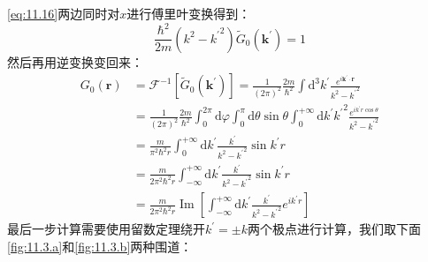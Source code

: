 \documentclass[a4paper,zihao=-4,linespread=1]{ctexrep}
\begin{document}
	\ref{eq:11.16}两边同时对$x$进行傅里叶变换得到：
	\[\frac{\hbar^2}{2m}\left(k^2-{k^\prime}^2\right)\tilde{G}_0(\mathbf{k}^\prime)=1\]
	然后再用逆变换变回来：
	\begin{equation}
		\label{eq:11.18}
		\begin{aligned}
			G_0(\mathbf{r})&=\mathscr{F}^{-1}\left[\tilde{G}_0(\mathbf{k}^\prime)\right]=\frac{1}{(2\pi)^2}\frac{2m}{\hbar^2}\int\mathrm{d}^3k^\prime\frac{e^{i\mathbf{k}^\prime\cdot\mathbf{r}}}{k^2-{k^\prime}^2}\\
			&=\frac{1}{(2\pi)^2}\frac{2m}{\hbar^2}\int_0^{2\pi}\mathrm{d}\varphi\int_0^\pi\mathrm{d}\theta\sin\theta\int_0^{+\infty}\mathrm{d}k^\prime{k^\prime}^2\frac{e^{i{k}^\prime{r}\cos\theta}}{k^2-{k^\prime}^2}\\
			&=\frac{m}{\pi^2\hbar^2r}\int_0^{+\infty}\mathrm{d}k^\prime\frac{{k^\prime}}{k^2-{k^\prime}^2}\sin k^\prime r\\
			&=\frac{m}{2\pi^2\hbar^2r}\int_{-\infty}^{+\infty}\mathrm{d}k^\prime\frac{{k^\prime}}{k^2-{k^\prime}^2}\sin k^\prime r\\
			&=\frac{m}{2\pi^2\hbar^2r}\operatorname{Im}\left[\int_{-\infty}^{+\infty}\mathrm{d}k^\prime\frac{{k^\prime}}{k^2-{k^\prime}^2}e^{ik^\prime r}\right]
		\end{aligned}
	\end{equation}
	最后一步计算需要使用留数定理绕开$k^\prime=\pm k$两个极点进行计算，我们取下面\ref{fig:11.3.a}和\ref{fig:11.3.b}两种围道：
\end{document}

